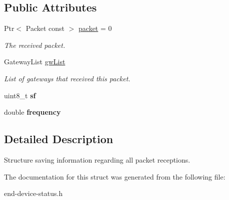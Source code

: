 \subsection*{Public Attributes}
\begin{DoxyCompactItemize}
\item 
\mbox{\label{structns3_1_1lorawan_1_1EndDeviceStatus_1_1ReceivedPacketInfo_aaf0f603c9a6e62f5a4868d995db6545d}} 
Ptr$<$ Packet const  $>$ \hyperlink{structns3_1_1lorawan_1_1EndDeviceStatus_1_1ReceivedPacketInfo_aaf0f603c9a6e62f5a4868d995db6545d}{packet} = 0
\begin{DoxyCompactList}\small\item\em The received packet. \end{DoxyCompactList}\item 
\mbox{\label{structns3_1_1lorawan_1_1EndDeviceStatus_1_1ReceivedPacketInfo_a44d324749296d27d0906bc83cf455f71}} 
Gateway\+List \hyperlink{structns3_1_1lorawan_1_1EndDeviceStatus_1_1ReceivedPacketInfo_a44d324749296d27d0906bc83cf455f71}{gw\+List}
\begin{DoxyCompactList}\small\item\em List of gateways that received this packet. \end{DoxyCompactList}\item 
\mbox{\label{structns3_1_1lorawan_1_1EndDeviceStatus_1_1ReceivedPacketInfo_a54e38a3ad9eb22c7bd895b92364bca88}} 
uint8\+\_\+t {\bfseries sf}
\item 
\mbox{\label{structns3_1_1lorawan_1_1EndDeviceStatus_1_1ReceivedPacketInfo_a458374748b0f14162121f1d414b3355f}} 
double {\bfseries frequency}
\end{DoxyCompactItemize}


\subsection{Detailed Description}
Structure saving information regarding all packet receptions. 

The documentation for this struct was generated from the following file\+:\begin{DoxyCompactItemize}
\item 
end-\/device-\/status.\+h\end{DoxyCompactItemize}
